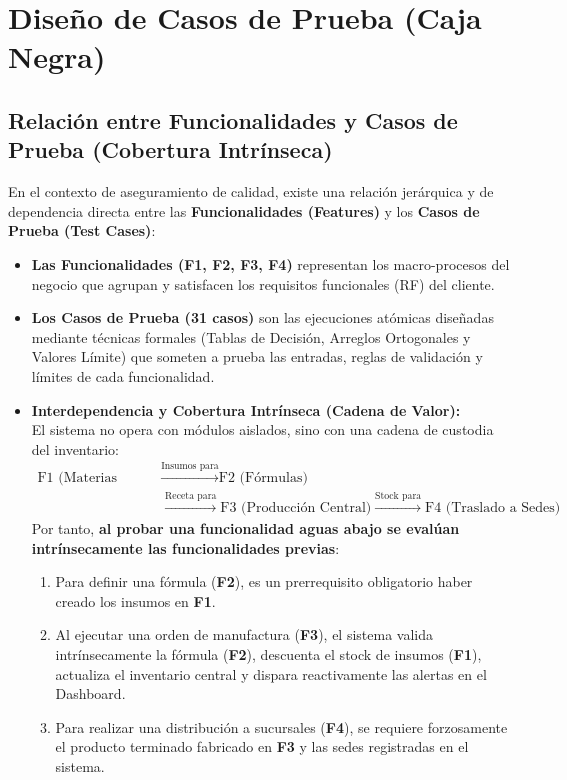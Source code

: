 \documentclass[11pt,a4paper]{article}
\begin{document}
\section{Diseño de Casos de Prueba (Caja Negra)}

\subsection{Relación entre Funcionalidades y Casos de Prueba (Cobertura Intrínseca)}
En el contexto de aseguramiento de calidad, existe una relación jerárquica y de dependencia directa entre las \textbf{Funcionalidades (Features)} y los \textbf{Casos de Prueba (Test Cases)}:
\begin{itemize}
    \item \textbf{Las Funcionalidades (F1, F2, F3, F4)} representan los macro-procesos del negocio que agrupan y satisfacen los requisitos funcionales (RF) del cliente.
    \item \textbf{Los Casos de Prueba (31 casos)} son las ejecuciones atómicas diseñadas mediante técnicas formales (Tablas de Decisión, Arreglos Ortogonales y Valores Límite) que someten a prueba las entradas, reglas de validación y límites de cada funcionalidad.
    \item \textbf{Interdependencia y Cobertura Intrínseca (Cadena de Valor):}\\
    El sistema no opera con módulos aislados, sino con una cadena de custodia del inventario:
    \begin{equation*}
    \begin{aligned}
        \text{F1 (Materias Primas)} &\xrightarrow{\text{Insumos para}} \text{F2 (Fórmulas)} \\
        &\xrightarrow{\text{Receta para}} \text{F3 (Producción Central)} \xrightarrow{\text{Stock para}} \text{F4 (Traslado a Sedes)}
    \end{aligned}
    \end{equation*}
    Por tanto, \textbf{al probar una funcionalidad aguas abajo se evalúan intrínsecamente las funcionalidades previas}:
    \begin{enumerate}[noitemsep]
        \item Para definir una fórmula (\textbf{F2}), es un prerrequisito obligatorio haber creado los insumos en \textbf{F1}.
        \item Al ejecutar una orden de manufactura (\textbf{F3}), el sistema valida intrínsecamente la fórmula (\textbf{F2}), descuenta el stock de insumos (\textbf{F1}), actualiza el inventario central y dispara reactivamente las alertas en el Dashboard.
        \item Para realizar una distribución a sucursales (\textbf{F4}), se requiere forzosamente el producto terminado fabricado en \textbf{F3} y las sedes registradas en el sistema.
    \end{enumerate}
\end{itemize}
\end{document}
